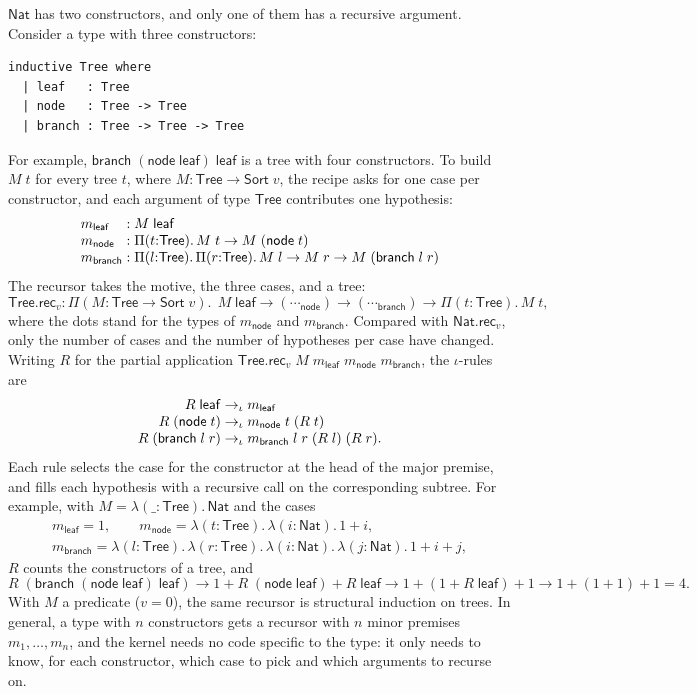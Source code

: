 \documentclass[acmsmall,screen,nonacm]{acmart}
\newcommand{\Sort}[1]{\mathsf{Sort}\;#1}
\newcommand{\tPi}[3]{\Pi(#1{:}#2).\,#3}
\newcommand{\tLam}[3]{\lambda(#1{:}#2).\,#3}
\newcommand{\Nat}{\mathsf{Nat}}
\newcommand{\NatRec}[1]{\mathsf{Nat.rec}_{#1}}
\newcommand{\iotared}{\to_{\iota}}
\begin{document}
$\Nat$ has two constructors, and only one of them has a recursive argument.
Consider a type with three constructors:
\begin{lstlisting}[numbers=none, columns=fullflexible, keepspaces=true]
inductive Tree where
  | leaf   : Tree
  | node   : Tree -> Tree
  | branch : Tree -> Tree -> Tree
\end{lstlisting}
For example, $\mathsf{branch}\;(\mathsf{node}\;\mathsf{leaf})\;\mathsf{leaf}$ is a tree with four constructors.
To build $M\;t$ for every tree $t$, where $M : \mathsf{Tree} \to \Sort{v}$, the recipe asks for one case per constructor,
and each argument of type $\mathsf{Tree}$ contributes one hypothesis:
\[
\begin{array}{l@{\;:\;}l}
m_{\mathsf{leaf}} & M\;\mathsf{leaf} \\
m_{\mathsf{node}} & \tPi{t}{\mathsf{Tree}}{M\;t \to M\;(\mathsf{node}\;t)} \\
m_{\mathsf{branch}} & \tPi{l}{\mathsf{Tree}}{\tPi{r}{\mathsf{Tree}}{M\;l \to M\;r \to M\;(\mathsf{branch}\;l\;r)}}
\end{array}
\]
The recursor takes the motive, the three cases, and a tree:
\[
\mathsf{Tree.rec}_v : \tPi{M}{\mathsf{Tree} \to \Sort{v}}{\;
  M\;\mathsf{leaf} \to (\cdots_{\mathsf{node}}) \to (\cdots_{\mathsf{branch}}) \to \tPi{t}{\mathsf{Tree}}{M\;t}},
\]
where the dots stand for the types of $m_{\mathsf{node}}$ and $m_{\mathsf{branch}}$.
Compared with $\NatRec{v}$, only the number of cases and the number of hypotheses per case have changed.
Writing $R$ for the partial application $\mathsf{Tree.rec}_v\;M\;m_{\mathsf{leaf}}\;m_{\mathsf{node}}\;m_{\mathsf{branch}}$,
the $\iota$-rules are
\[
\begin{array}{r@{\;}c@{\;}l}
R\;\mathsf{leaf} &\iotared& m_{\mathsf{leaf}} \\
R\;(\mathsf{node}\;t) &\iotared& m_{\mathsf{node}}\;t\;(R\;t) \\
R\;(\mathsf{branch}\;l\;r) &\iotared& m_{\mathsf{branch}}\;l\;r\;(R\;l)\;(R\;r).
\end{array}
\]
Each rule selects the case for the constructor at the head of the major premise, and fills each hypothesis with a recursive call on the corresponding subtree.
For example, with $M = \tLam{\_}{\mathsf{Tree}}{\Nat}$ and the cases
\[
\begin{array}{l}
m_{\mathsf{leaf}} = 1, \qquad
m_{\mathsf{node}} = \tLam{t}{\mathsf{Tree}}{\tLam{i}{\Nat}{1 + i}}, \\[2pt]
m_{\mathsf{branch}} = \tLam{l}{\mathsf{Tree}}{\tLam{r}{\mathsf{Tree}}{\tLam{i}{\Nat}{\tLam{j}{\Nat}{1 + i + j}}}},
\end{array}
\]
$R$ counts the constructors of a tree, and
\[
R\;(\mathsf{branch}\;(\mathsf{node}\;\mathsf{leaf})\;\mathsf{leaf})
\to 1 + R\;(\mathsf{node}\;\mathsf{leaf}) + R\;\mathsf{leaf}
\to 1 + (1 + R\;\mathsf{leaf}) + 1
\to 1 + (1 + 1) + 1 = 4.
\]
With $M$ a predicate ($v = 0$), the same recursor is structural induction on trees.
In general, a type with $n$ constructors gets a recursor with $n$ minor premises $m_1, \ldots, m_n$,
and the kernel needs no code specific to the type: it only needs to know, for each constructor, which case to pick and which arguments to recurse on.
\end{document}
